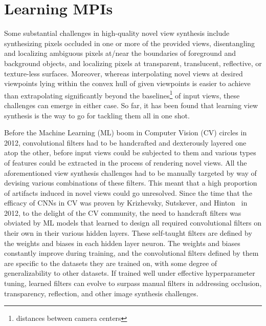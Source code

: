 \section{Learning MPIs}\label{sec:learning-mpis} 

Some substantial challenges in high-quality novel view synthesis include synthesizing pixels occluded in one or more of the provided views, disentangling and localizing ambiguous pixels at/near the boundaries of foreground and background objects, and localizing pixels at transparent, translucent, reflective, or texture-less surfaces. Moreover, whereas interpolating novel views at desired viewpoints lying within the convex hull of given viewpoints is easier to achieve than extrapolating significantly beyond the baselines\footnote{distances between camera centers} of input views, these challenges can emerge in either case. So far, it has been found that learning view synthesis is the way to go for tackling them all in one shot.

Before the Machine Learning (ML) boom in Computer Vision (CV) circles in 2012, convolutional filters had to be handcrafted and dexterously layered one atop the other, before input views could be subjected to them and various types of features could be extracted in the process of rendering novel views. All the aforementioned view synthesis challenges had to be manually targeted by way of devising various combinations of these filters. This meant that a high proportion of artifacts induced in novel views could go unresolved. Since the time that the efficacy of CNNs in CV was proven by Krizhevsky, Sutskever, and Hinton~\cite{krizhevsky_imagenet_2012} in 2012, to the delight of the CV community, the need to handcraft filters was obviated by ML models that learned to design all required convolutional filters on their own in their various hidden layers. These self-taught filters are defined by the weights and biases in each hidden layer neuron. The weights and biases constantly improve during training, and the convolutional filters defined by them are specific to the datasets they are trained on, with some degree of generalizability to other datasets. If trained well under effective hyperparameter tuning, learned filters can evolve to surpass manual filters in addressing occlusion, transparency, reflection, and other image synthesis challenges.

